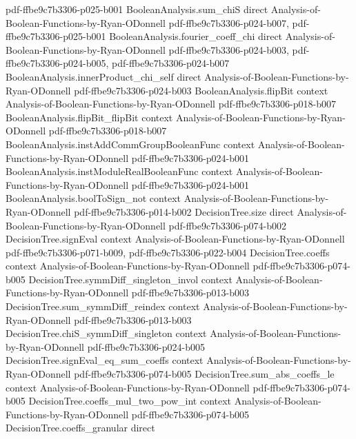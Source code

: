 \begin{theorem}
  {pdf-ffbe9c7b3306-p025-b001}
\proofstep
  {BooleanAnalysis.sum_chiS}
  {direct}
  {Analysis-of-Boolean-Functions-by-Ryan-ODonnell}
  {pdf-ffbe9c7b3306-p024-b007,
    pdf-ffbe9c7b3306-p025-b001}
\proofstep
  {BooleanAnalysis.fourier_coeff_chi}
  {direct}
  {Analysis-of-Boolean-Functions-by-Ryan-ODonnell}
  {pdf-ffbe9c7b3306-p024-b003,
    pdf-ffbe9c7b3306-p024-b005,
    pdf-ffbe9c7b3306-p024-b007}
\proofstep
  {BooleanAnalysis.innerProduct_chi_self}
  {direct}
  {Analysis-of-Boolean-Functions-by-Ryan-ODonnell}
  {pdf-ffbe9c7b3306-p024-b003}
\proofstep
  {BooleanAnalysis.flipBit}
  {context}
  {Analysis-of-Boolean-Functions-by-Ryan-ODonnell}
  {pdf-ffbe9c7b3306-p018-b007}
\proofstep
  {BooleanAnalysis.flipBit_flipBit}
  {context}
  {Analysis-of-Boolean-Functions-by-Ryan-ODonnell}
  {pdf-ffbe9c7b3306-p018-b007}
\proofstep
  {BooleanAnalysis.instAddCommGroupBooleanFunc}
  {context}
  {Analysis-of-Boolean-Functions-by-Ryan-ODonnell}
  {pdf-ffbe9c7b3306-p024-b001}
\proofstep
  {BooleanAnalysis.instModuleRealBooleanFunc}
  {context}
  {Analysis-of-Boolean-Functions-by-Ryan-ODonnell}
  {pdf-ffbe9c7b3306-p024-b001}
\proofstep
  {BooleanAnalysis.boolToSign_not}
  {context}
  {Analysis-of-Boolean-Functions-by-Ryan-ODonnell}
  {pdf-ffbe9c7b3306-p014-b002}
\proofstep
  {DecisionTree.size}
  {direct}
  {Analysis-of-Boolean-Functions-by-Ryan-ODonnell}
  {pdf-ffbe9c7b3306-p074-b002}
\proofstep
  {DecisionTree.signEval}
  {context}
  {Analysis-of-Boolean-Functions-by-Ryan-ODonnell}
  {pdf-ffbe9c7b3306-p071-b009,
    pdf-ffbe9c7b3306-p022-b004}
\proofstep
  {DecisionTree.coeffs}
  {context}
  {Analysis-of-Boolean-Functions-by-Ryan-ODonnell}
  {pdf-ffbe9c7b3306-p074-b005}
\proofstep
  {DecisionTree.symmDiff_singleton_invol}
  {context}
  {Analysis-of-Boolean-Functions-by-Ryan-ODonnell}
  {pdf-ffbe9c7b3306-p013-b003}
\proofstep
  {DecisionTree.sum_symmDiff_reindex}
  {context}
  {Analysis-of-Boolean-Functions-by-Ryan-ODonnell}
  {pdf-ffbe9c7b3306-p013-b003}
\proofstep
  {DecisionTree.chiS_symmDiff_singleton}
  {context}
  {Analysis-of-Boolean-Functions-by-Ryan-ODonnell}
  {pdf-ffbe9c7b3306-p024-b005}
\proofstep
  {DecisionTree.signEval_eq_sum_coeffs}
  {context}
  {Analysis-of-Boolean-Functions-by-Ryan-ODonnell}
  {pdf-ffbe9c7b3306-p074-b005}
\proofstep
  {DecisionTree.sum_abs_coeffs_le}
  {context}
  {Analysis-of-Boolean-Functions-by-Ryan-ODonnell}
  {pdf-ffbe9c7b3306-p074-b005}
\proofstep
  {DecisionTree.coeffs_mul_two_pow_int}
  {context}
  {Analysis-of-Boolean-Functions-by-Ryan-ODonnell}
  {pdf-ffbe9c7b3306-p074-b005}
\proofstep
  {DecisionTree.coeffs_granular}
  {direct}

\end{theorem}
